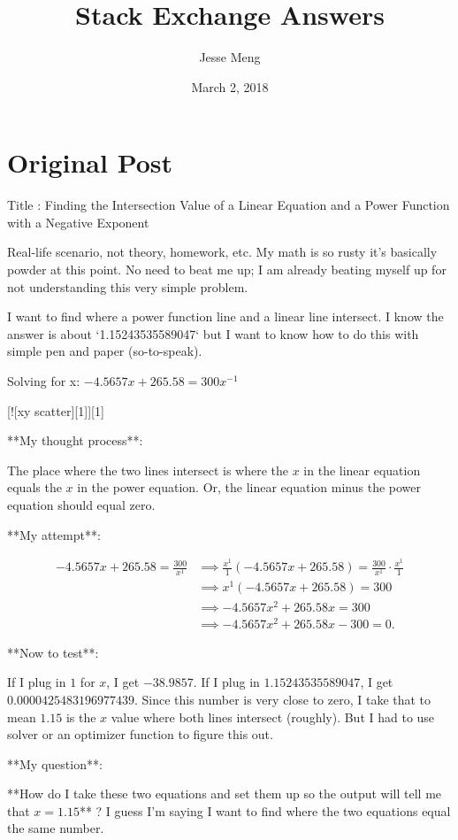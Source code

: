 \documentclass{article}
\title{Stack Exchange Answers}
\author{Jesse Meng }
\date{March 2, 2018}
\begin{document}
\maketitle

\section{Original Post}
Title : Finding the Intersection Value of a Linear Equation and a Power Function with a Negative Exponent

Real-life scenario, not theory, homework, etc. My math is so rusty it's basically powder at this point. No need to beat me up; I am already beating myself up for not understanding this very simple problem.

I want to find where a power function line and a linear line intersect. I know the answer is about `1.15243535589047` but I want to know how to do this with simple pen and paper (so-to-speak).

Solving for x: $-4.5657x + 265.58 = 300x^{-1}$

[![xy scatter][1]][1]

**My thought process**:

The place where the two lines intersect is where the $x$ in the linear equation equals the $x$ in the power equation. Or, the linear equation minus the power equation should equal zero.

**My attempt**:

\begin{align}
-4.5657x + 265.58 = \frac{300}{x^1}
&\implies \frac{x^1}{1} (-4.5657x + 265.58) = \frac{300}{x^1} \cdot \frac{x^1}{1} \\
&\implies x^1(-4.5657x + 265.58) = 300 \\
&\implies -4.5657x^2 + 265.58x = 300 \\
&\implies -4.5657x^2 + 265.58x -300 = 0.
\end{align}

**Now to test**:

If I plug in $1$ for $x$, I get $-38.9857$. If I plug in $1.15243535589047$, I get $0.0000425483196977439$. Since this number is very close to zero, I take that to mean $1.15$ is the $x$ value where both lines intersect (roughly). But I had to use solver or an optimizer function to figure this out. 

**My question**:

**How do I take these two equations and set them up so the output will tell me that $x = 1.15$** ? I guess I'm saying I want to find where the two equations equal the same number.
\end{document}

